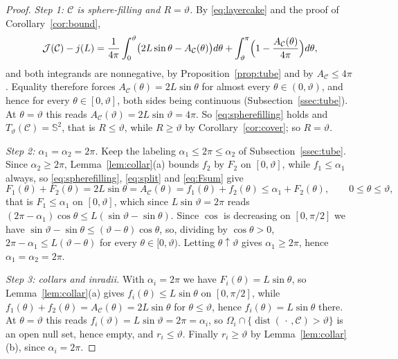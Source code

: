 \documentclass[11pt,oneside,reqno]{amsart}
\theoremstyle{plain}
\theoremstyle{definition}
\DeclareMathOperator{\dist}{dist}
\newcommand{\Sph}{\mathbb{S}^{2}}
\begin{document}
\begin{proof}
\emph{Step 1: $\mathcal{C}$ is sphere-filling and $R=\vartheta$.} By
\eqref{eq:layercake} and the proof of Corollary~\ref{cor:bound},
\[
  \mathcal{J}(\mathcal{C})-j(L)
  =\frac{1}{4\pi}\int_{0}^{\vartheta}
     \bigl(2L\sin\theta-A_{\mathcal{C}}(\theta)\bigr)d\theta
   +\int_{\vartheta}^{\pi}\Bigl(1-\frac{A_{\mathcal{C}}(\theta)}{4\pi}\Bigr)d\theta ,
\]
and both integrands are nonnegative, by Proposition~\ref{prop:tube} and by
$A_{\mathcal{C}}\le4\pi$. Equality therefore forces
$A_{\mathcal{C}}(\theta)=2L\sin\theta$ for almost every $\theta\in(0,\vartheta)$,
and hence for every $\theta\in[0,\vartheta]$, both sides being continuous
(Subsection~\ref{ssec:tube}). At $\theta=\vartheta$ this reads
$A_{\mathcal{C}}(\vartheta)=2L\sin\vartheta=4\pi$. So \eqref{eq:spherefilling} holds and
$T_{\vartheta}(\mathcal{C})=\Sph$, that is $R\le\vartheta$, while
$R\ge\vartheta$ by Corollary~\ref{cor:cover}; so $R=\vartheta$.

\emph{Step 2: $\alpha_{1}=\alpha_{2}=2\pi$.} Keep the labeling
$\alpha_{1}\le2\pi\le\alpha_{2}$ of Subsection~\ref{ssec:tube}. Since
$\alpha_{2}\ge2\pi$, Lemma~\ref{lem:collar}(a) bounds $f_{2}$ by $F_{2}$ on
$[0,\vartheta]$, while $f_{1}\le\alpha_{1}$ always, so
\eqref{eq:spherefilling}, \eqref{eq:split} and \eqref{eq:Fsum} give
\[
  F_{1}(\theta)+F_{2}(\theta)=2L\sin\theta=A_{\mathcal{C}}(\theta)
  =f_{1}(\theta)+f_{2}(\theta)\le\alpha_{1}+F_{2}(\theta),
  \qquad 0\le\theta\le\vartheta ,
\]
that is $F_{1}\le\alpha_{1}$ on $[0,\vartheta]$, which since $L\sin\vartheta=2\pi$
reads $(2\pi-\alpha_{1})\cos\theta\le L(\sin\vartheta-\sin\theta)$. Since $\cos$
is decreasing on $[0,\pi/2]$ we have
$\sin\vartheta-\sin\theta\le(\vartheta-\theta)\cos\theta$, so, dividing by
$\cos\theta>0$,
$2\pi-\alpha_{1}\le L(\vartheta-\theta)$ for every
$\theta\in[0,\vartheta)$. Letting $\theta\uparrow\vartheta$ gives
$\alpha_{1}\ge2\pi$, hence $\alpha_{1}=\alpha_{2}=2\pi$.

\emph{Step 3: collars and inradii.} With $\alpha_{i}=2\pi$ we have
$F_{i}(\theta)=L\sin\theta$, so Lemma~\ref{lem:collar}(a) gives
$f_{i}(\theta)\le L\sin\theta$ on
$[0,\pi/2]$, while $f_{1}(\theta)+f_{2}(\theta)=A_{\mathcal{C}}(\theta)=2L\sin\theta$
for $\theta\le\vartheta$, hence $f_{i}(\theta)=L\sin\theta$ there. At
$\theta=\vartheta$ this reads
$f_{i}(\vartheta)=L\sin\vartheta=2\pi=\alpha_{i}$, so
$\Omega_{i}\cap\{\dist(\,\cdot\,,\mathcal{C})>\vartheta\}$ is an open null set, hence
empty, and $r_{i}\le\vartheta$. Finally $r_{i}\ge\vartheta$ by
Lemma~\ref{lem:collar}(b), since $\alpha_{i}=2\pi$.
\end{proof}
\end{document}
